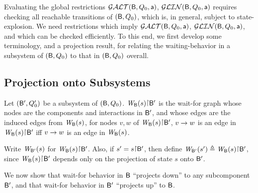 
   \label{s:local.preamble}
%   

Evaluating the global restrictions $\GAO(\B,Q_0,\act)$, $\GLin(\B,Q_0,\act)$ requires checking all reachable transitions of
$(\B, Q_0)$, which is, in general, subject to state-explosion.
We need restrictions which imply $\GAO(\B,Q_0,\act)$, $\GLin(\B,Q_0,\act)$,
and which can be checked efficiently.
%
To this end, we first develop some terminology, and a projection result, for relating the waiting-behavior in a
subsystem of $(\B,Q_0)$ to that in $(\B,Q_0)$ overall.



\subsection{Projection onto Subsystems}
\label{s:projection}

\begin{definition} \label{defn:projWgraph}
Let $(\B', Q'_0)$ be a subsystem of $(\B, Q_0)$. 
$\wfg{\B}{s} \pj \B'$ is the wait-for graph whose nodes are the
components and interactions in $\B'$, and whose edges are the induced
edges from $\wfg{\B}{s}$, \ie for nodes $v, w$ of $\wfg{\B}{s} \pj \B'$,
$v \ar w$ is an edge in $\wfg{\B}{s} \pj \B'$ iff $v \ar w$ is an edge in $\wfg{\B}{s}$.

Write $\lwfg{\B}{s}{\B'}$ for $\wfg{\B}{s} \pj \B'$.
Also, if $s' = s \pj \B'$, then define
$\lwfg{\B}{s'}{\B'} \df \wfg{\B}{s} \pj \B'$, since $\wfg{\B}{s} \pj \B'$ depends only
on the projection of state $s$ onto $\B'$.
\end{definition}

We now show that wait-for behavior in $\B$ ``projects down''
to any subcomponent $\B'$, and that wait-for behavior in $\B'$ ``projects up'' to $\B$.


